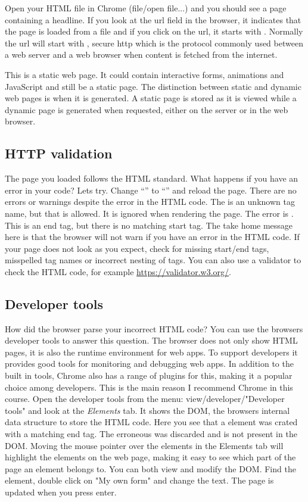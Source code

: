 \documentclass[fleqn, article, a4paper]{memoir}
\begin{document}
Open your HTML file in Chrome (file/open file...) and you should see a page containing a headline. If you look at the url field in the browser, it indicates that the page is loaded from a file and if you click on the url, it starts with . Normally the url will start with , secure http which is the protocol commonly used between a web server and a web browser when content is fetched from the internet.

This is a static web page. It could contain interactive forms, animations and JavaScript and still be a static page. The distinction between static and dynamic web pages is when it is generated. A static page is stored as it is viewed while a dynamic page is generated when requested, either on the server or in the web browser.

\subsection*{HTTP validation}
The page you loaded follows the HTML standard. What happens if you have an error in your code? Lets try. Change ``'' to ``'' and reload the page. There are no errors or warnings despite the error in the HTML code. The  is an unknown tag name, but that is allowed. It is ignored when rendering the page. The error is . This is an end tag, but there is no matching start tag. The take home message here is that the browser will not warn if you have an error in the HTML code. If your page does not look as you expect, check for missing start/end tags, misspelled tag names or incorrect nesting of tags. You can also use a validator to check the HTML code, for example \url{https://validator.w3.org/}.

\subsection*{Developer tools}
How did the browser parse your incorrect HTML code? You can use the browsers developer tools to answer this question. The browser does not only show HTML pages, it is also the runtime environment for web apps. To support developers it provides good tools for monitoring and debugging web apps. In addition to the built in tools, Chrome also has a range of plugins for this, making it a popular choice among developers. This is the main reason I recommend Chrome in this course. Open the developer tools from the menu: view/developer/"Developer tools" and look at the \emph{Elements} tab. It shows the DOM, the browsers internal data structure to store the HTML code. Here you see that a  element was crated with a matching end tag. The erroneous  was discarded and is not present in the DOM. Moving the mouse pointer over the elements in the Elements tab will highlight the elements on the web page, making it easy to see which part of the page an element belongs to. You can both view and modify the DOM. Find the  element, double click on "My own form" and change the text. The page is updated when you press enter. 
\end{document}
